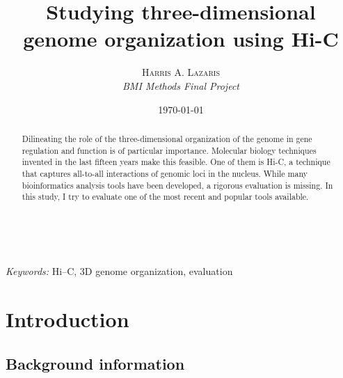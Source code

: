 \documentclass[a4paper, 11pt]{article} %
\title{\textbf{Studying three-dimensional genome organization using Hi-C}} %
\author{\textsc{Harris A. Lazaris}\\ %
{\textit{BMI Methods Final Project}}} %
\date{\today} %
\makeatletter
\renewcommand{\maketitle}{ %
\begin{flushright} %
{\LARGE\@title} %

\vspace{50pt} %

{\large\@author} %
\\\@date %

\vspace{40pt} %
\end{flushright}
}
\makeatother
\begin{document}
\maketitle %


\renewcommand{\abstractname}{Summary} %

\begin{abstract}
	Dilineating the role of the three-dimensional organization of the genome in gene regulation and function is of particular importance. Molecular biology techniques
	invented in the last fifteen years make this feasible. One of them is Hi-C, a technique that captures all-to-all interactions of genomic loci in the nucleus. While many bioinformatics analysis tools have been developed, a rigorous evaluation is missing. In this study, I try to evaluate one of the most recent and popular tools available.
\end{abstract}

\hspace*{3,6mm}\textit{Keywords:} Hi--C, 3D genome organization, evaluation  %

\vspace{30pt} %


\section*{Introduction}

\subsection*{Background information}
\end{document}
